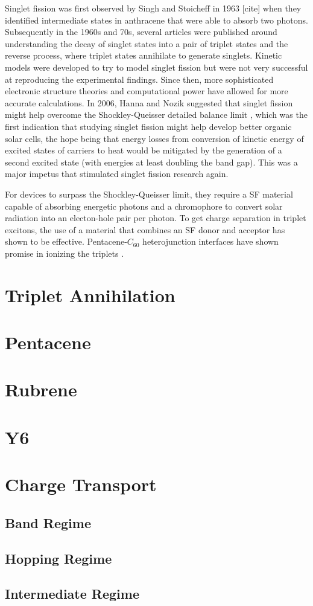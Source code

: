 Singlet fission was first observed by Singh and Stoicheff in 1963 [cite] when they identified intermediate states in anthracene that were able to absorb two photons. Subsequently in the 1960s and 70s, several articles were published around understanding the decay of singlet states into a pair of triplet states and the reverse process, where triplet states annihilate to generate singlets. Kinetic models were developed to try to model singlet fission but were not very successful at reproducing the experimental findings. Since then, more sophisticated electronic structure theories and computational power have allowed for more accurate calculations. In 2006, Hanna and Nozik suggested that singlet fission might help overcome the Shockley-Queisser detailed balance limit \cite{hanna2006solar}, which was the first indication that studying singlet fission might help develop better organic solar cells, the hope being that energy losses from conversion of kinetic energy of excited states of carriers to heat would be mitigated by the generation of a second excited state (with energies at least doubling the band gap). This was a major impetus that stimulated singlet fission research again.


For devices to surpass the Shockley-Queisser limit, they require a SF material capable of absorbing energetic photons and a chromophore to convert solar radiation into an electon-hole pair per photon. To get charge separation in triplet excitons, the use of a material that combines an SF donor and acceptor has shown to be effective. Pentacene-$C_{60}$ heterojunction interfaces have shown promise in ionizing the triplets \cite{rao2010exciton}.



\section{Triplet Annihilation}


\section{Pentacene}

\section{Rubrene}

\section{Y6}

\section{Charge Transport}

\cite{oberhofer2017charge}


\subsection{Band Regime}

\subsection{Hopping Regime}

\subsection{Intermediate Regime}